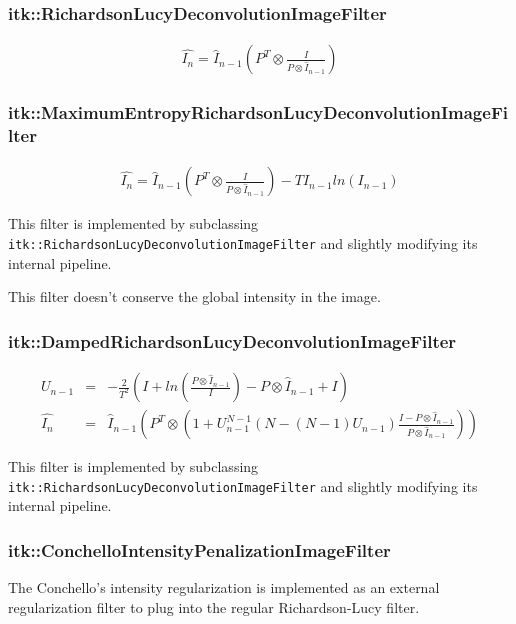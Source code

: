 \documentclass{InsightArticle}
\begin{document}
\subsubsection{itk::RichardsonLucyDeconvolutionImageFilter}

\begin{eqnarray}
\label{eq:imageFormation}
\hat{I_n} = \hat{I}_{n-1} \left(  P^T \otimes \frac{I}{ P \otimes \hat{I}_{n-1}} \right)
\end{eqnarray}

\subsubsection{itk::MaximumEntropyRichardsonLucyDeconvolutionImageFilter}

\begin{eqnarray}
\label{eq:imageFormation}
\hat{I_n} = \hat{I}_{n-1} \left(  P^T \otimes \frac{I}{ P \otimes \hat{I}_{n-1}} \right) - T I_{n-1} ln(I_{n-1})
\end{eqnarray}

This filter is implemented by subclassing \verb$itk::RichardsonLucyDeconvolutionImageFilter$ and slightly
modifying its internal pipeline.

This filter doesn't conserve the global intensity in the image.

\subsubsection{itk::DampedRichardsonLucyDeconvolutionImageFilter}

\begin{eqnarray}
\label{eq:imageFormation}
U_{n-1}   & = & -\frac{2}{T^2}\left(I+ln(\frac{P \otimes \hat{I}_{n-1}}{I})-P \otimes \hat{I}_{n-1}+I\right) \\
\hat{I_n} & = & \hat{I}_{n-1} \left(  P^T \otimes \left(1+ U_{n-1}^{N-1}(N-(N-1)U_{n-1})\frac{I - P \otimes \hat{I}_{n-1}}{ P \otimes \hat{I}_{n-1}} \right)\right)
\end{eqnarray}

This filter is implemented by subclassing \verb$itk::RichardsonLucyDeconvolutionImageFilter$ and slightly
modifying its internal pipeline.

\subsubsection{itk::ConchelloIntensityPenalizationImageFilter}

The Conchello's intensity regularization is implemented as an external regularization filter to plug into the regular
Richardson-Lucy filter.
\end{document}
